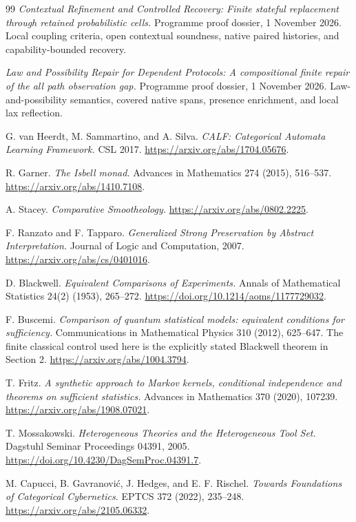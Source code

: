 \documentclass[11pt]{article}
\theoremstyle{definition}
\begin{document}
\begin{thebibliography}{99}
\emph{Contextual Refinement and Controlled Recovery: Finite stateful replacement through retained probabilistic cells.}
Programme proof dossier, 1 November 2026. Local coupling criteria, open contextual soundness, native paired histories, and capability-bounded recovery.

\emph{Law and Possibility Repair for Dependent Protocols: A compositional finite repair of the all path observation gap.}
Programme proof dossier, 1 November 2026. Law-and-possibility semantics, covered native spans, presence enrichment, and local lax reflection.

G. van Heerdt, M. Sammartino, and A. Silva.
\emph{CALF: Categorical Automata Learning Framework.}
CSL 2017.
\url{https://arxiv.org/abs/1704.05676}.

R. Garner. \emph{The Isbell monad.}
Advances in Mathematics 274 (2015), 516--537.
\url{https://arxiv.org/abs/1410.7108}.

A. Stacey. \emph{Comparative Smootheology.}
\url{https://arxiv.org/abs/0802.2225}.

F. Ranzato and F. Tapparo.
\emph{Generalized Strong Preservation by Abstract Interpretation.}
Journal of Logic and Computation, 2007.
\url{https://arxiv.org/abs/cs/0401016}.

D. Blackwell. \emph{Equivalent Comparisons of Experiments.}
Annals of Mathematical Statistics 24(2) (1953), 265--272.
\url{https://doi.org/10.1214/aoms/1177729032}.

F. Buscemi. \emph{Comparison of quantum statistical models: equivalent conditions for sufficiency.}
Communications in Mathematical Physics 310 (2012), 625--647. The finite classical control used here is the explicitly stated Blackwell theorem in Section 2.
\url{https://arxiv.org/abs/1004.3794}.

T. Fritz. \emph{A synthetic approach to Markov kernels, conditional independence and theorems on sufficient statistics.}
Advances in Mathematics 370 (2020), 107239.
\url{https://arxiv.org/abs/1908.07021}.

T. Mossakowski. \emph{Heterogeneous Theories and the Heterogeneous Tool Set.}
Dagstuhl Seminar Proceedings 04391, 2005.
\url{https://doi.org/10.4230/DagSemProc.04391.7}.

M. Capucci, B. Gavranovi\'{c}, J. Hedges, and E. F. Rischel.
\emph{Towards Foundations of Categorical Cybernetics.}
EPTCS 372 (2022), 235--248.
\url{https://arxiv.org/abs/2105.06332}.


\end{thebibliography}
\end{document}
